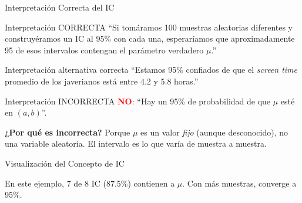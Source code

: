 \documentclass[aspectratio=169, 11pt]{beamer}
\begin{document}
\begin{frame}{Interpretación Correcta del IC}
\begin{alertblock}{Interpretaci\'on CORRECTA}
``Si tom\'aramos 100 muestras aleatorias diferentes y construy\'eramos un IC al 95\% con cada una, esperar\'iamos que aproximadamente \alert{95 de esos intervalos} contengan el par\'ametro verdadero $\mu$.''
\end{alertblock}

\smallskip
\begin{exampleblock}{Interpretaci\'on alternativa correcta}
``Estamos 95\% confiados de que el \emph{screen time} promedio de los javerianos est\'a entre 4.2 y 5.8 horas.''
\end{exampleblock}

\smallskip
\begin{block}{Interpretaci\'on INCORRECTA}
\textcolor{red}{\textbf{NO}}: ``Hay un 95\% de probabilidad de que $\mu$ esté en $(a, b)$''.

\vspace{0.2cm}
\textbf{¿Por qué es incorrecta?} Porque $\mu$ es un valor \emph{fijo} (aunque desconocido), no una variable aleatoria. El intervalo es lo que varía de muestra a muestra.
\end{block}
\end{frame}

\begin{frame}{Visualización del Concepto de IC}
\begin{center}
\end{center}

\smallskip
\small
En este ejemplo, 7 de 8 IC (87.5\%) contienen a $\mu$. Con más muestras, converge a 95\%.
\end{frame}
\end{document}
